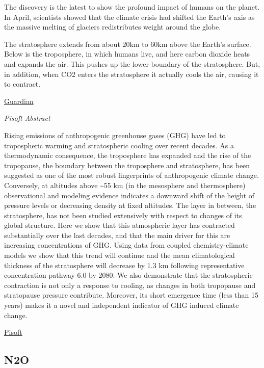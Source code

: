 \documentclass[
]{book}
\begin{document}
The discovery is the latest to show the profound impact of humans on the planet. In April, scientists showed that the climate crisis had shifted the Earth's axis as the massive melting of glaciers redistributes weight around the globe.

The stratosphere extends from about 20km to 60km above the Earth's surface. Below is the troposphere, in which humans live, and here carbon dioxide heats and expands the air. This pushes up the lower boundary of the stratosphere. But, in addition, when CO2 enters the stratosphere it actually cools the air, causing it to contract.

\href{https://www.theguardian.com/environment/2021/may/12/emissions-shrinking-the-stratosphere-scientists-find}{Guardian}

\emph{Pisoft Abstract}

Rising emissions of anthropogenic greenhouse gases (GHG) have led to tropospheric warming and stratospheric cooling over recent decades. As a thermodynamic consequence, the troposphere has expanded and the rise of the tropopause, the boundary between the troposphere and stratosphere, has been suggested as one of the most robust fingerprints of anthropogenic climate change. Conversely, at altitudes above \textasciitilde55 km (in the mesosphere and thermosphere) observational and modeling evidence indicates a downward shift of the height of pressure levels or decreasing density at fixed altitudes. The layer in between, the stratosphere, has not been studied extensively with respect to changes of its global structure. Here we show that this atmospheric layer has contracted substantially over the last decades, and that the main driver for this are increasing concentrations of GHG. Using data from coupled chemistry-climate models we show that this trend will continue and the mean climatological thickness of the stratosphere will decrease by 1.3 km following representative concentration pathway 6.0 by 2080. We also demonstrate that the stratospheric contraction is not only a response to cooling, as changes in both tropopause and stratopause pressure contribute. Moreover, its short emergence time (less than 15 years) makes it a novel and independent indicator of GHG induced climate change.

\href{https://iopscience.iop.org/article/10.1088/1748-9326/abfe2b}{Pisoft}

\hypertarget{n2o}{%
\subsection{N2O}\label{n2o}}
\end{document}
